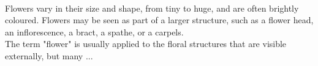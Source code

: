 {{\\[1\baselineskip]
Flowers vary in their size and shape, from tiny to huge, and are often brightly coloured. Flowers may be seen as part of a larger structure, such as a flower head, an inflorescence, a bract, a spathe, or a carpels.
\\[1\baselineskip]
The term "flower" is usually applied to the floral structures that are visible externally, but many ...

}}

